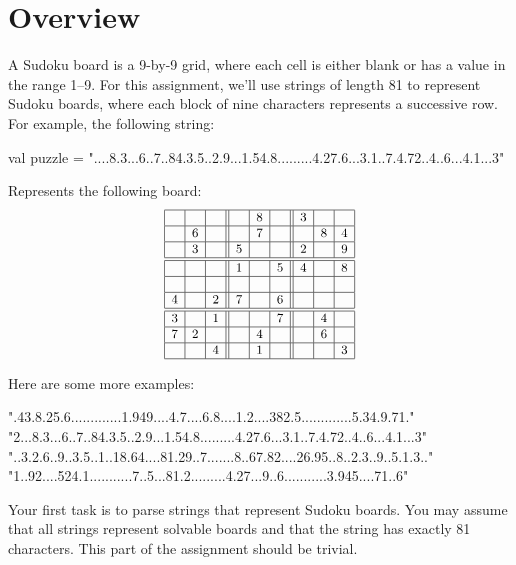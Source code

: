 \documentclass{book}
\begin{document}
\section{Overview}

A Sudoku board is a 9-by-9 grid, where each cell is either blank or has a
value in the range 1--9. For this assignment, we'll use strings of length
81 to represent Sudoku boards, where each block of nine characters
represents a successive row. For example, the following string:

\begin{scalacode}
val puzzle =
  "....8.3...6..7..84.3.5..2.9...1.54.8.........4.27.6...3.1..7.4.72..4..6...4.1...3"
\end{scalacode}

Represents the following board:
\[
\small
\begin{array}{|c|c|c||c|c|c||c|c|c|}
\hline
  &   &   &   & 8 &   & 3 &    & \\
\hline
  & 6 &   &   & 7 &   &   & 8 & 4 \\
\hline
  & 3 &   & 5 &   &   & 2 &   & 9 \\
\hline \hline
  &   &   & 1 &   & 5 & 4 &   & 8 \\
\hline
  &   &   &   &   &   &   &   &   \\
\hline
4 &   & 2 & 7 &   & 6 &   &   &   \\
\hline \hline
3 &   & 1 &   &   & 7 &   & 4 &   \\
\hline
7 & 2 &   &   & 4 &   &   & 6 &   \\
\hline
  &   & 4 &   & 1 &   &   &   & 3 \\
\hline
\end{array}
\]

Here are some more examples:

\begin{scalacode}
".43.8.25.6.............1.949....4.7....6.8....1.2....382.5.............5.34.9.71."
"2...8.3...6..7..84.3.5..2.9...1.54.8.........4.27.6...3.1..7.4.72..4..6...4.1...3"
"..3.2.6..9..3.5..1..18.64....81.29..7.......8..67.82....26.95..8..2.3..9..5.1.3.."
"1..92....524.1...........7..5...81.2.........4.27...9..6...........3.945....71..6"
\end{scalacode}

Your first task is to parse strings that represent Sudoku boards. You may
assume that all strings represent solvable boards and that the string has
exactly 81 characters. This part of the assignment should be trivial.
\end{document}
